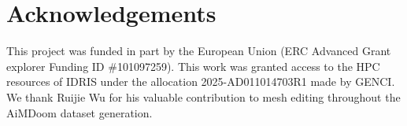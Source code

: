 \section{Acknowledgements}

This project was funded in part by the European Union (ERC Advanced Grant explorer Funding ID \#101097259). This work was granted access to the HPC resources of IDRIS under the allocation 2025-AD011014703R1 made by GENCI. We thank Ruijie Wu for his valuable contribution to mesh editing throughout the AiMDoom dataset generation.